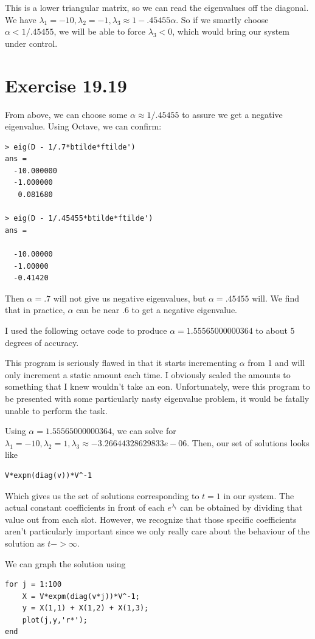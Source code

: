 \documentclass[11pt]{article}
\begin{document}
This is a lower triangular matrix, so we can
read the eigenvalues off the diagonal. We have
$\lambda_1 = -10, \lambda_2 = -1, \lambda_3 
\approx 1 - .45455 \alpha$. So if we smartly choose
$\alpha < 1/.45455$, we will be able to force
$\lambda_3 < 0$, which would bring our system
under control.
    
\section*{Exercise 19.19}
From above, we can choose some $\alpha \approx 
1/.45455$ to assure we get a negative eigenvalue.
Using Octave, we can confirm:

\begin{verbatim}
> eig(D - 1/.7*btilde*ftilde')
ans =
  -10.000000
  -1.000000
   0.081680

> eig(D - 1/.45455*btilde*ftilde')
ans =

  -10.00000
  -1.00000
  -0.41420
\end{verbatim}

Then $\alpha = .7$ will not give us negative
eigenvalues, but $\alpha = .45455$ will. We
find that in practice, $\alpha$ can be near
$.6$ to get a negative eigenvalue. 

I used the following octave code to produce $\alpha =  1.55565000000364$ to
about $5$ degrees of accuracy.

This program is seriously flawed in that it starts incrementing $\alpha$ from
1 and will only increment a static amount each time. I obviously scaled
the amounts to something that I knew wouldn't take an eon. Unfortunately,
were this program to be presented with some particularly nasty eigenvalue
problem, it would be fatally unable to perform the task. 

Using $\alpha =  1.55565000000364$, we can solve for $\lambda_1 = -10, 
\lambda_2 = 1, \lambda_3 \approx -3.26644328629833e-06$. Then, our 
set of solutions looks like 
\begin{verbatim}
V*expm(diag(v))*V^-1
\end{verbatim}

Which gives us the set of solutions corresponding
to $t = 1$ in our system. The actual constant coefficients
in front of each $e^{\lambda_i}$ can be obtained by
dividing that value out from each slot. However, we recognize
that those specific coefficients aren't particularly important since
we only really care about the behaviour of the solution as $t -> \infty$.

We can graph the solution using
\begin{verbatim}
for j = 1:100
    X = V*expm(diag(v*j))*V^-1;
    y = X(1,1) + X(1,2) + X(1,3);
    plot(j,y,'r*');
end
\end{verbatim}
\end{document}

